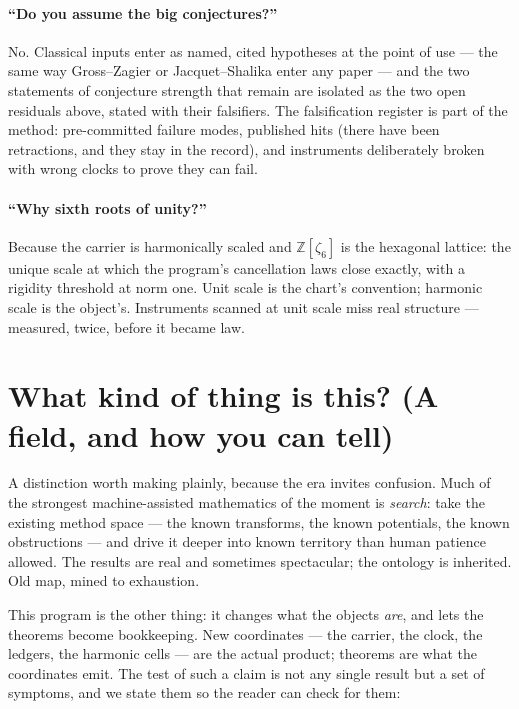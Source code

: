 \documentclass[11pt]{article}
\begin{document}
\paragraph{``Do you assume the big conjectures?''}
No.  Classical inputs enter as named, cited hypotheses at the point of use ---
the same way Gross--Zagier or Jacquet--Shalika enter any paper --- and the two
statements of conjecture strength that remain are isolated as the two open
residuals above, stated with their falsifiers.  The falsification register is
part of the method: pre-committed failure modes, published hits (there have been
retractions, and they stay in the record), and instruments deliberately broken
with wrong clocks to prove they can fail.

\paragraph{``Why sixth roots of unity?''}
Because the carrier is harmonically scaled and $\mathbb Z[\zeta_6]$ is the
hexagonal lattice: the unique scale at which the program's cancellation laws
close exactly, with a rigidity threshold at norm one.  Unit scale is the chart's
convention; harmonic scale is the object's.  Instruments scanned at unit scale
miss real structure --- measured, twice, before it became law.

\section{What kind of thing is this?  (A field, and how you can tell)}

A distinction worth making plainly, because the era invites confusion.  Much of
the strongest machine-assisted mathematics of the moment is \emph{search}: take
the existing method space --- the known transforms, the known potentials, the
known obstructions --- and drive it deeper into known territory than human
patience allowed.  The results are real and sometimes spectacular; the ontology
is inherited.  Old map, mined to exhaustion.

This program is the other thing: it changes what the objects \emph{are}, and
lets the theorems become bookkeeping.  New coordinates --- the carrier, the
clock, the ledgers, the harmonic cells --- are the actual product; theorems are
what the coordinates emit.  The test of such a claim is not any single result
but a set of symptoms, and we state them so the reader can check for them:
\end{document}
